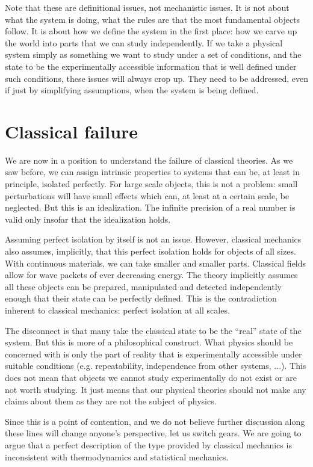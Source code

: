 \documentclass[10pt,twocolumn, nofootinbib]{revtex4-2}
\begin{document}
Note that these are definitional issues, not mechanistic issues. It is not about what the system is doing, what the rules are that the most fundamental objects follow. It is about how we define the system in the first place: how we carve up the world into parts that we can study independently. If we take a physical system simply as something we want to study under a set of conditions, and the state to be the experimentally accessible information that is well defined under such conditions, these issues will always crop up. They need to be addressed, even if just by simplifying assumptions, when the system is being defined.

\section{Classical failure}

We are now in a position to understand the failure of classical theories. As we saw before, we can assign intrinsic properties to systems that can be, at least in principle, isolated perfectly. For large scale objects, this is not a problem: small perturbations will have small effects which can, at least at a certain scale, be neglected. But this is an idealization. The infinite precision of a real number is valid only insofar that the idealization holds.

Assuming perfect isolation by itself is not an issue. However, classical mechanics also assumes, implicitly, that this perfect isolation holds for objects of all sizes. With continuous materials, we can take smaller and smaller parts. Classical fields allow for wave packets of ever decreasing energy. The theory implicitly assumes all these objects can be prepared, manipulated and detected independently enough that their state can be perfectly defined. This is the contradiction inherent to classical mechanics: perfect isolation at all scales.

The disconnect is that many take the classical state to be the ``real'' state of the system. But this is more of a philosophical construct. What physics should be concerned with is only the part of reality that is experimentally accessible under suitable conditions (e.g. repeatability, independence from other systems, ...). This does not mean that objects we cannot study experimentally do not exist or are not worth studying. It just means that our physical theories should not make any claims about them as they are not the subject of physics.

Since this is a point of contention, and we do not believe further discussion along these lines will change anyone's perspective, let us switch gears. We are going to argue that a perfect description of the type provided by classical mechanics is inconsistent with thermodynamics and statistical mechanics.
\end{document}
